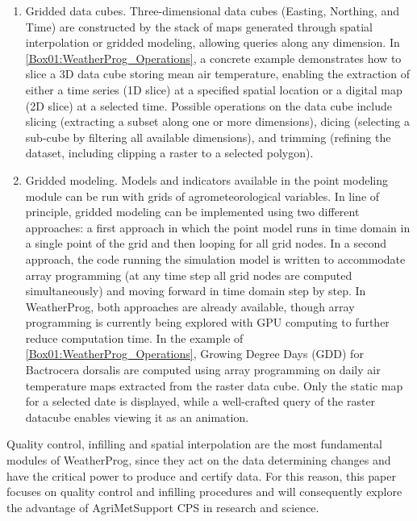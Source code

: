 \documentclass[authoryear,preprint,review,12pt]{elsarticle}
\begin{document}
\begin{enumerate}
    \item Gridded data cubes. Three-dimensional data cubes (Easting, Northing, and Time) are constructed by the stack of maps generated through spatial interpolation or gridded modeling, allowing queries along any dimension. 
    In \cref{Box01:WeatherProg_Operations}, a concrete example demonstrates how to slice a 3D data cube storing mean air temperature, enabling the extraction of either a time series (1D slice) at a specified spatial location %
    or a digital map (2D slice) at a selected time. %
    Possible operations on the data cube include slicing (extracting a subset along one or more dimensions), dicing (selecting a sub-cube by filtering all available dimensions), and trimming (refining the dataset, including clipping a raster to a selected polygon).
    
    \item Gridded modeling.
    Models and indicators available in the point modeling module can be run with grids of agrometeorological variables.
    In line of principle, gridded modeling can be implemented using two different approaches: a first approach in which the point model runs in time domain in a single point of the grid and then looping for all grid nodes.
    In a second approach, the code running the simulation model is written to accommodate array programming (at any time step all grid nodes are computed simultaneously) and moving forward in time domain step by step.
    In WeatherProg, both approaches are already available, though array programming is currently being explored with GPU computing to further reduce computation time.
    In the example of \cref{Box01:WeatherProg_Operations}, Growing Degree Days (GDD) for Bactrocera dorsalis are computed using array programming on daily air temperature maps extracted from the raster data cube.
    Only the static map for a selected date is displayed, while a well-crafted query of the raster datacube enables viewing it as an animation. %
\end{enumerate}

Quality control, infilling and spatial interpolation are the most fundamental modules of WeatherProg, since they act on the data determining changes and have the critical power to produce and certify data.
For this reason, this paper focuses on quality control and infilling procedures and will consequently explore the advantage of AgriMetSupport CPS in research and science.
\end{document}
